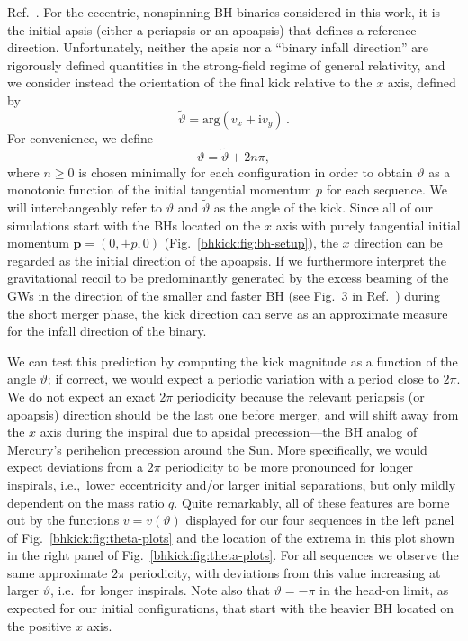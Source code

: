 Ref.~\cite{Sperhake:2019wwo}. For the eccentric, nonspinning BH
binaries considered in this work, it is the
initial apsis (either a periapsis or an apoapsis)
that defines a reference direction. Unfortunately,
neither the apsis nor a ``binary infall direction''
are rigorously defined
quantities in the strong-field regime of general relativity,
and we consider instead the orientation of the final
kick relative to the $x$ axis, defined by
%
\begin{equation}
  \tilde{\vartheta} = \mathrm{arg}(v_x + \mathrm{i}v_y)\,.
\end{equation}
For convenience, we define
\begin{equation}
    \vartheta = \tilde{\vartheta} + 2n\pi,
\end{equation}
where $n\geq 0$ is chosen minimally for each configuration in order to obtain
$\vartheta$ as a monotonic function of the initial tangential momentum $p$
for each sequence. We will interchangeably refer to $\vartheta$
and $\tilde{\vartheta}$ as the angle of the kick.
%
Since all of our simulations start with the BHs located on the $x$
axis with purely tangential initial momentum $\mathbf{p}=(0,\pm p,0)$
(Fig.~\ref{bhkick:fig:bh-setup}), the $x$ direction can be regarded as the
initial direction of the apoapsis. If we furthermore interpret the
gravitational recoil to be predominantly generated by the excess
beaming of the GWs in the direction of the smaller and faster BH (see
Fig.~3 in Ref.~\cite{Wiseman:1992dv}) during the short merger phase,
the kick direction can serve as an approximate measure for the infall
direction of the binary.

We can test this prediction by computing the kick magnitude
as a function of the angle $\vartheta$; if correct, we would
expect a periodic variation with a period close to $2\pi$.
We do not expect an exact $2\pi$ periodicity because the
relevant periapsis (or apoapsis) direction should be the last one before merger,
and will shift away from the $x$ axis during the inspiral
due to
apsidal precession---the BH analog
of Mercury's perihelion precession around the Sun. More
specifically, we would expect deviations from a $2\pi$ periodicity
to be more pronounced for longer inspirals, i.e.,~lower eccentricity
and/or larger initial separations, but only mildly
dependent on the mass ratio $q$.
Quite remarkably, all of these
features are borne out by the functions $v = v(\vartheta)$
displayed for our four sequences in the left panel of
Fig.~\ref{bhkick:fig:theta-plots}
and the location of the extrema in this plot shown in
the right panel of Fig.~\ref{bhkick:fig:theta-plots}.
For all sequences we observe the same approximate $2\pi$ periodicity,
with deviations from this value increasing at larger
$\vartheta$, i.e.~for longer inspirals.
Note also that $\vartheta=-\pi$ in the head-on limit, as expected
for our initial configurations, that start with the heavier BH
located on the positive $x$ axis.

